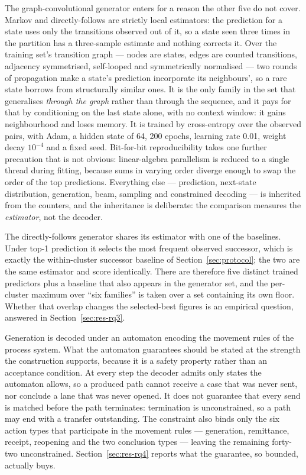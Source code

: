 The graph-convolutional generator enters for a reason the other five do not cover. Markov and
directly-follows are strictly local estimators: the prediction for a state uses only the
transitions observed out of it, so a state seen three times in the partition has a three-sample
estimate and nothing corrects it. Over the training set's transition graph --- nodes are states,
edges are counted transitions, adjacency symmetrised, self-looped and symmetrically normalised
--- two rounds of propagation make a state's prediction incorporate its neighbours', so a rare
state borrows from structurally similar ones. It is the only family in the set that generalises
\emph{through the graph} rather than through the sequence, and it pays for that by conditioning on
the last state alone, with no context window: it gains neighbourhood and loses memory. It is
trained by cross-entropy over the observed pairs, with Adam, a hidden state of 64, 200 epochs,
learning rate 0.01, weight decay $10^{-4}$ and a fixed seed. Bit-for-bit reproducibility takes one
further precaution that is not obvious: linear-algebra parallelism is reduced to a single thread
during fitting, because sums in varying order diverge enough to swap the order of the top
predictions. Everything else --- prediction, next-state distribution, generation, beam, sampling
and constrained decoding --- is inherited from the counters, and the inheritance is deliberate:
the comparison measures the \emph{estimator}, not the decoder.

The directly-follows generator shares its estimator with one of the baselines. Under top-1
prediction it selects the most frequent observed successor, which is exactly the within-cluster
successor baseline of Section~\ref{sec:protocol}; the two are the same estimator and score
identically. There are therefore five distinct trained predictors plus a baseline that also
appears in the generator set, and the per-cluster maximum over ``six families'' is taken over a
set containing its own floor. Whether that overlap changes the selected-best figures is an
empirical question, answered in Section~\ref{sec:res-rq3}.

Generation is decoded under an automaton encoding the movement rules of the process system. What
the automaton guarantees should be stated at the strength the construction supports, because it
is a safety property rather than an acceptance condition. At every step the decoder admits only
states the automaton allows, so a produced path cannot receive a case that was never sent, nor
conclude a lane that was never opened. It does not guarantee that every send is matched before
the path terminates: termination is unconstrained, so a path may end with a transfer outstanding.
The constraint also binds only the six action types that participate in the movement rules ---
generation, remittance, receipt, reopening and the two conclusion types --- leaving the remaining
forty-two unconstrained. Section~\ref{sec:res-rq4} reports what the guarantee, so bounded,
actually buys.


